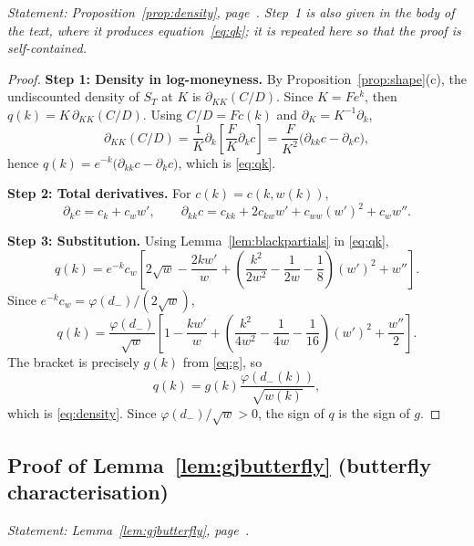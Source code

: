 \noindent\emph{Statement: Proposition~\ref{prop:density}, page~\pageref{prop:density}. Step~1
is also given in the body of the text, where it produces equation~\eqref{eq:qk}; it is repeated
here so that the proof is self-contained.}\medskip

\begin{proof}
\noindent\textbf{Step 1: Density in log-moneyness.}
By Proposition~\ref{prop:shape}(c), the undiscounted density of $S_T$ at $K$ is
$\partial_{KK}(C/D)$. Since $K=Fe^k$, then $q(k)=K\,\partial_{KK}(C/D).$
Using $C/D=Fc(k)$ and $\partial_K=K^{-1}\partial_k$,
\[
\partial_{KK}(C/D)
=\frac1K\partial_k\left[\frac{F}{K}\partial_kc\right]
=\frac{F}{K^2}\bigl(\partial_{kk}c-\partial_kc\bigr),
\]
hence $q(k)=e^{-k}\bigl(\partial_{kk}c-\partial_kc\bigr)$, which is \eqref{eq:qk}.

\medskip
\noindent\textbf{Step 2: Total derivatives.}
For $c(k)=c(k,w(k))$,
\[
\partial_kc=c_k+c_ww',
\qquad
\partial_{kk}c=c_{kk}+2c_{kw}w'+c_{ww}(w')^2+c_ww''.
\]

\medskip
\noindent\textbf{Step 3: Substitution.}
Using Lemma~\ref{lem:blackpartials} in \eqref{eq:qk},
\[
q(k)=e^{-k}c_w\left[
2\sqrt w-\frac{2kw'}{w}
+\left(\frac{k^2}{2w^2}-\frac{1}{2w}-\frac18\right)(w')^2+w''
\right].
\]
Since $e^{-k}c_w=\varphi(d_-)/(2\sqrt w)$,
\[
q(k)=\frac{\varphi(d_-)}{\sqrt w}
\left[
1-\frac{kw'}{w}
+\left(\frac{k^2}{4w^2}-\frac{1}{4w}-\frac{1}{16}\right)(w')^2
+\frac{w''}{2}
\right].
\]
The bracket is precisely $g(k)$ from \eqref{eq:g}, so
\[
q(k)=g(k)\frac{\varphi(d_-(k))}{\sqrt{w(k)}},
\]
which is \eqref{eq:density}. Since $\varphi(d_-)/\sqrt w>0$, the sign of $q$ is the sign of $g$.
\end{proof}

\subsection{Proof of Lemma~\ref{lem:gjbutterfly} (butterfly characterisation)}
\label{proof:gjbutterfly}

\noindent\emph{Statement: Lemma~\ref{lem:gjbutterfly}, page~\pageref{lem:gjbutterfly}.}\medskip

